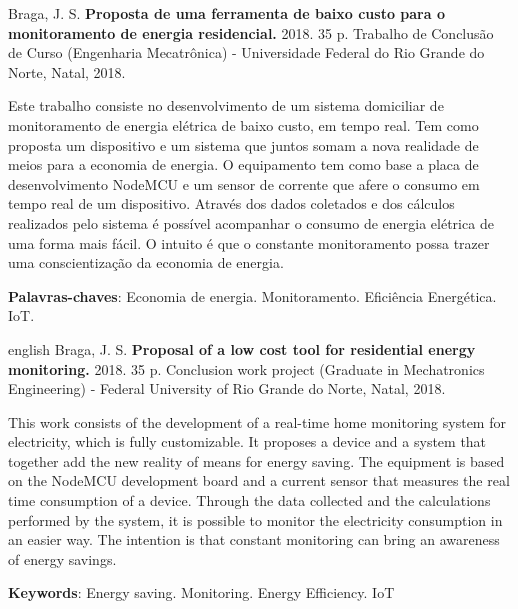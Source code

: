 \setlength{\absparsep}{18pt} %
\begin{resumo}
Braga, J. S. \textbf{Proposta de uma ferramenta de baixo custo para o monitoramento de energia residencial.} 2018. 35 p. Trabalho de Conclusão de Curso
(Engenharia Mecatrônica) - Universidade Federal do Rio Grande do Norte, Natal, 2018.
\vspace*{1cm}


Este trabalho consiste no desenvolvimento de um sistema domiciliar de monitoramento de energia elétrica de baixo custo, em tempo real.
Tem como proposta um dispositivo e um sistema que juntos somam a nova realidade de meios para a economia de energia.
O equipamento tem como base a placa de desenvolvimento NodeMCU e um sensor de corrente que afere o consumo em tempo real de um dispositivo. Através
dos dados coletados e dos cálculos realizados pelo sistema é possível acompanhar o consumo de energia elétrica de uma forma mais fácil.
O intuito é que o constante monitoramento possa trazer uma conscientização da economia de energia.
 
 \noindent
 \textbf{Palavras-chaves}: Economia de energia. Monitoramento. Eficiência Energética. IoT. 
\end{resumo}
\begin{resumo}[Abstract]
	\begin{otherlanguage*}{english}	
Braga, J. S. \textbf{	Proposal of a low cost tool for residential energy monitoring.} 2018. 35 p. Conclusion work project (Graduate in Mechatronics Engineering) - Federal
University of Rio Grande do Norte, Natal, 2018.
\vspace*{1cm}	
	
This work consists of the development of a real-time home monitoring system for electricity, which is fully customizable.
It proposes a device and a system that together add the new reality of means for energy saving.
The equipment is based on the NodeMCU development board and a current sensor that measures the real time consumption of a device. Through
the data collected and the calculations performed by the system, it is possible to monitor the electricity consumption in an easier way.
The intention is that constant monitoring can bring an awareness of energy savings.
	
	\vspace{\onelineskip}
	\noindent 
	\textbf{Keywords}: Energy saving. Monitoring. Energy Efficiency. IoT
	\end{otherlanguage*}
\end{resumo}